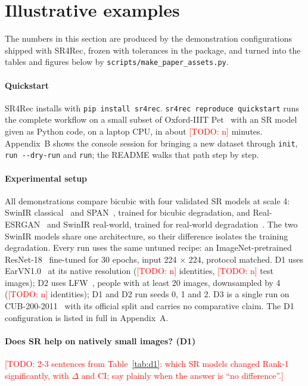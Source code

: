 \documentclass[preprint,12pt]{elsarticle}
\newcommand{\todo}[1]{\textcolor{red}{[TODO: #1]}}
\providecommand{\DONENumTest}{\todo{n}}
\providecommand{\DONENumClasses}{\todo{n}}
\providecommand{\DTWONumClasses}{\todo{n}}
\begin{document}
\section{Illustrative examples}
\label{sec:examples}

The numbers in this section are produced by the demonstration configurations shipped with SR4Rec,
frozen with tolerances in the package, and turned into the tables and figures below by
\texttt{scripts/make\_paper\_assets.py}.

\paragraph{Quickstart} SR4Rec installs with \texttt{pip install sr4rec}.
\texttt{sr4rec reproduce quickstart} runs the complete workflow on a small subset of Oxford-IIIT
Pet~\cite{parkhi2012pets} with an SR model given as Python code, on a laptop CPU, in about
\todo{n} minutes. Appendix~B shows the console session for bringing a new dataset through
\texttt{init}, \texttt{run -{}-dry-run} and \texttt{run}; the README walks that path step by step.

\paragraph{Experimental setup} All demonstrations compare bicubic with four validated SR models
at scale 4: SwinIR classical~\cite{liang2021swinir} and SPAN~\cite{wan2024span}, trained for bicubic
degradation, and Real-ESRGAN~\cite{wang2021realesrgan} and SwinIR real-world, trained for real-world
degradation~\cite{zhang2021bsrgan}. The two SwinIR models share one architecture, so their difference
isolates the training degradation. Every run uses the same untuned recipe: an ImageNet-pretrained
ResNet-18~\cite{he2016resnet} fine-tuned for 30 epochs, input 224 $\times$ 224, protocol matched.
D1 uses EarVN1.0~\cite{hoang2019earvn} at its native resolution (\DONENumClasses{} identities,
\DONENumTest{} test images); D2 uses LFW~\cite{huang2007lfw}, people with at least 20 images,
downsampled by 4 (\DTWONumClasses{} identities); D1 and D2 run seeds 0, 1 and 2. D3 is a single run
on CUB-200-2011~\cite{wah2011cub} with its official split and carries no comparative claim. The D1
configuration is listed in full in Appendix~A.

\paragraph{Does SR help on natively small images? (D1)} \todo{2-3 sentences from
Table~\ref{tab:d1}: which SR models changed Rank-1 significantly, with $\Delta$ and CI; say plainly
when the answer is ``no difference''.}
\end{document}
